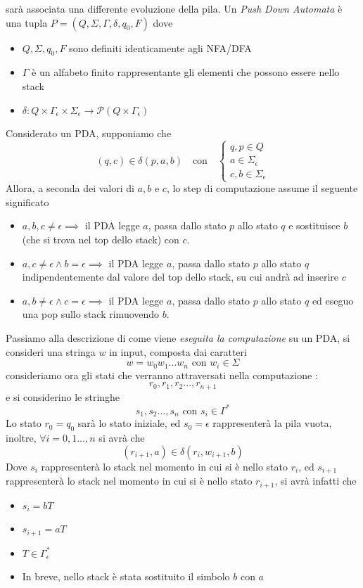 \documentclass[10pt, letterpaper]{report}
\begin{document}
sarà associata una differente evoluzione della pila.\acc 
{} Un \textit{Push Down Automata} è una tupla $P=(Q,\Sigma,\Gamma,\delta,q_0,F)$ dove \begin{itemize}
    \item $Q,\Sigma,q_0,F$ sono definiti identicamente agli NFA/DFA 
    \item $\Gamma$ è un alfabeto finito rappresentante gli elementi che possono essere nello stack 
    \item $\delta : Q\times\Gamma_\epsilon\times\Sigma_\epsilon\rightarrow\mathcal{P}(Q\times\Gamma_\epsilon)$
\end{itemize}
Considerato un PDA, supponiamo che 
$$ (q,c)\in\delta(p,a,b) \ \ \ \text{ con } \ \ \  
\begin{cases}
    q,p\in Q \\ a\in \Sigma_\epsilon \\ c,b \in \Sigma_\epsilon
\end{cases} $$
Allora, a seconda dei valori di $a,b$ e $c$, lo step di computazione assume il seguente significato\begin{itemize}
    \item $a,b,c\ne\epsilon\implies$ il PDA legge $a$, passa dallo stato $p$ allo stato $q$ e sostituisce 
    $b$ (che si trova nel top dello stack) con $c$. 
    \item $a,c\ne\epsilon\land b=\epsilon\implies $ il PDA legge $a$, passa dallo stato $p$ allo stato $q$ 
    indipendentemente dal valore del top dello stack, su cui andrà ad inserire $c$ 
    \item $a,b\ne\epsilon\land c=\epsilon\implies $ il PDA legge $a$, passa dallo stato $p$ allo stato $q$ ed 
    eseguo una pop sullo stack rimuovendo $b$.
\end{itemize}
Passiamo alla descrizione di come viene \textit{eseguita la computazione} su un PDA, si consideri una stringa $w$ in input, 
composta dai caratteri $$w=w_0w_1\dots w_n \text{ con } w_i\in\Sigma$$ consideriamo ora gli stati che 
verranno attraversati nella computazione : $$r_0,r_1,r_2\dots, r_{n+1}$$
e si considerino le stringhe 
$$ s_1,s_2\dots, s_n \text{ con } s_i\in\Gamma^*$$
Lo stato $r_0=q_0$ sarà lo stato iniziale, ed $s_0=\epsilon$ rappresenterà la pila vuota, inoltre, 
$\forall i = 0,1\dots, n$ si avrà che  
$$ (r_{i+1},a)\in\delta(r_i,w_{i+1},b)$$
Dove $s_i$ rappresenterà lo stack nel momento in cui si è nello stato $r_i$, ed $s_{i+1}$
rappresenterà lo stack nel momento in cui si è nello stato $r_{i+1}$, si avrà infatti che \begin{itemize}
    \item $s_i = bT$ 
    \item $s_{i+1}= aT$ 
    \item $T\in \Gamma_\epsilon^*$
    \item In breve, nello stack è stata sostituito il simbolo $b$ con $a$
\end{itemize}
\end{document}
